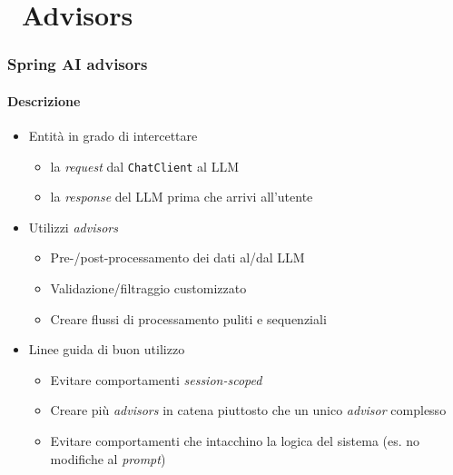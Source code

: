 \section{\faWrench\ Advisors} %
\label{sec:spring-ai-advisors}
%
\begin{frame}[t,fragile] \frametitle{Spring AI advisors}
    \framesubtitle{Descrizione}
    {\footnotesize
    \begin{itemize}[leftmargin=10pt,align=right]
        \item[\alert{\faArrowCircleRight}] Entità in grado di intercettare
        \begin{itemize}[leftmargin=10pt,align=right]
            \item[\alert{\faArrowCircleRight}] la \textit{request} dal \texttt{ChatClient} al LLM
            \item[\alert{\faArrowCircleRight}] la \textit{response} del LLM prima che arrivi all'utente
        \end{itemize}
        \item[\alert{\faArrowCircleRight}] Utilizzi \textit{advisors}
        \begin{itemize}[leftmargin=10pt,align=right]
            \item[\alert{\faArrowCircleRight}] Pre-/post-processamento dei dati al/dal LLM
            \item[\alert{\faArrowCircleRight}] Validazione/filtraggio customizzato
            \item[\alert{\faArrowCircleRight}] Creare flussi di processamento puliti e sequenziali
        \end{itemize}
        \item[\alert{\faArrowCircleRight}] Linee guida di buon utilizzo
        \begin{itemize}[leftmargin=10pt,align=right]
            \item[\alert{\faArrowCircleRight}] Evitare comportamenti \textit{session-scoped}
            \item[\alert{\faArrowCircleRight}] Creare più \textit{advisors} in catena piuttosto che un unico \textit{advisor} complesso
            \item[\alert{\faArrowCircleRight}] Evitare comportamenti che intacchino la logica del sistema (es. \alert{no modifiche al \textit{prompt}})
        \end{itemize}
    \end{itemize}
    }
\end{frame}
